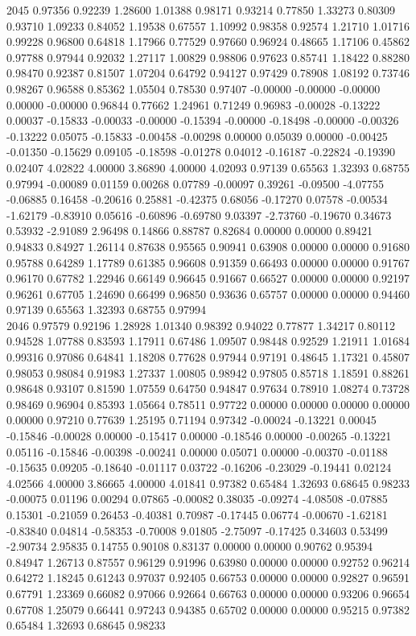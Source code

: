 {2045 0.97356 0.92239 1.28600 1.01388 0.98171 0.93214 0.77850 1.33273 0.80309 0.93710 1.09233 0.84052 1.19538 0.67557 1.10992 0.98358 0.92574 1.21710 1.01716 0.99228 0.96800 0.64818 1.17966 0.77529 0.97660 0.96924 0.48665 1.17106 0.45862 0.97788 0.97944 0.92032 1.27117 1.00829 0.98806 0.97623 0.85741 1.18422 0.88280 0.98470 0.92387 0.81507 1.07204 0.64792 0.94127 0.97429 0.78908 1.08192 0.73746 0.98267 0.96588 0.85362 1.05504 0.78530 0.97407 -0.00000 -0.00000 -0.00000 0.00000 -0.00000 0.96844 0.77662 1.24961 0.71249 0.96983 -0.00028 -0.13222 0.00037 -0.15833 -0.00033 -0.00000 -0.15394 -0.00000 -0.18498 -0.00000 -0.00326 -0.13222 0.05075 -0.15833 -0.00458 -0.00298 0.00000 0.05039 0.00000 -0.00425 -0.01350 -0.15629 0.09105 -0.18598 -0.01278 0.04012 -0.16187 -0.22824 -0.19390 0.02407 4.02822 4.00000 3.86890 4.00000 4.02093 0.97139 0.65563 1.32393 0.68755 0.97994 -0.00089 0.01159 0.00268 0.07789 -0.00097 0.39261 -0.09500 -4.07755 -0.06885 0.16458 -0.20616 0.25881 -0.42375 0.68056 -0.17270 0.07578 -0.00534 -1.62179 -0.83910 0.05616 -0.60896 -0.69780 9.03397 -2.73760 -0.19670 0.34673 0.53932 -2.91089 2.96498 0.14866 0.88787 0.82684 0.00000 0.00000 0.89421 0.94833 0.84927 1.26114 0.87638 0.95565 0.90941 0.63908 0.00000 0.00000 0.91680 0.95788 0.64289 1.17789 0.61385 0.96608 0.91359 0.66493 0.00000 0.00000 0.91767 0.96170 0.67782 1.22946 0.66149 0.96645 0.91667 0.66527 0.00000 0.00000 0.92197 0.96261 0.67705 1.24690 0.66499 0.96850 0.93636 0.65757 0.00000 0.00000 0.94460 0.97139 0.65563 1.32393 0.68755 0.97994 \\
2046 0.97579 0.92196 1.28928 1.01340 0.98392 0.94022 0.77877 1.34217 0.80112 0.94528 1.07788 0.83593 1.17911 0.67486 1.09507 0.98448 0.92529 1.21911 1.01684 0.99316 0.97086 0.64841 1.18208 0.77628 0.97944 0.97191 0.48645 1.17321 0.45807 0.98053 0.98084 0.91983 1.27337 1.00805 0.98942 0.97805 0.85718 1.18591 0.88261 0.98648 0.93107 0.81590 1.07559 0.64750 0.94847 0.97634 0.78910 1.08274 0.73728 0.98469 0.96904 0.85393 1.05664 0.78511 0.97722 0.00000 0.00000 0.00000 0.00000 0.00000 0.97210 0.77639 1.25195 0.71194 0.97342 -0.00024 -0.13221 0.00045 -0.15846 -0.00028 0.00000 -0.15417 0.00000 -0.18546 0.00000 -0.00265 -0.13221 0.05116 -0.15846 -0.00398 -0.00241 0.00000 0.05071 0.00000 -0.00370 -0.01188 -0.15635 0.09205 -0.18640 -0.01117 0.03722 -0.16206 -0.23029 -0.19441 0.02124 4.02566 4.00000 3.86665 4.00000 4.01841 0.97382 0.65484 1.32693 0.68645 0.98233 -0.00075 0.01196 0.00294 0.07865 -0.00082 0.38035 -0.09274 -4.08508 -0.07885 0.15301 -0.21059 0.26453 -0.40381 0.70987 -0.17445 0.06774 -0.00670 -1.62181 -0.83840 0.04814 -0.58353 -0.70008 9.01805 -2.75097 -0.17425 0.34603 0.53499 -2.90734 2.95835 0.14755 0.90108 0.83137 0.00000 0.00000 0.90762 0.95394 0.84947 1.26713 0.87557 0.96129 0.91996 0.63980 0.00000 0.00000 0.92752 0.96214 0.64272 1.18245 0.61243 0.97037 0.92405 0.66753 0.00000 0.00000 0.92827 0.96591 0.67791 1.23369 0.66082 0.97066 0.92664 0.66763 0.00000 0.00000 0.93206 0.96654 0.67708 1.25079 0.66441 0.97243 0.94385 0.65702 0.00000 0.00000 0.95215 0.97382 0.65484 1.32693 0.68645 0.98233 \\
}
